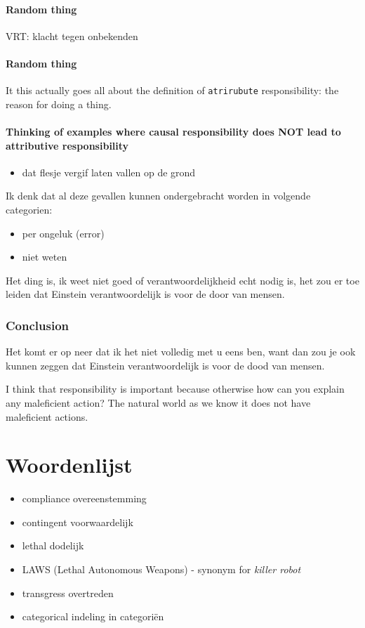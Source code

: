 \documentclass[../main/main.tex]{subfiles}
\begin{document}
\paragraph{Random thing}
VRT: klacht tegen onbekenden


\paragraph{Random thing}
It this actually goes all about the definition of \texttt{atrirubute} responsibility: the reason for doing a thing.

\paragraph{Thinking of examples where causal responsibility does NOT lead to attributive responsibility}
\begin{itemize}
\item dat flesje vergif laten vallen op de grond
\end{itemize}
Ik denk dat al deze gevallen kunnen ondergebracht worden in volgende categorien:
\begin{itemize}
\item per ongeluk (error)
\item niet weten
\end{itemize}

Het ding is, ik weet niet goed of verantwoordelijkheid echt nodig is, het zou er toe leiden dat Einstein verantwoordelijk is voor de door van mensen.

\subsubsection{Conclusion}
Het komt er op neer dat ik het niet volledig met u eens ben, want dan zou je ook kunnen zeggen dat Einstein verantwoordelijk is voor de dood van mensen.

I think that responsibility is important because otherwise how can you explain any maleficient action? The natural world as we know it does not have maleficient actions.


\newpage
\section{Woordenlijst}
\begin{itemize}
\item compliance \hfill overeenstemming
\item contingent \hfill voorwaardelijk
\item lethal	\hfill dodelijk
\item LAWS	\hfill (Lethal Autonomous Weapons) - synonym for \textit{killer robot}

\item transgress \hfill overtreden
\item categorical \hfill indeling in categoriën

\end{itemize}
\end{document}
